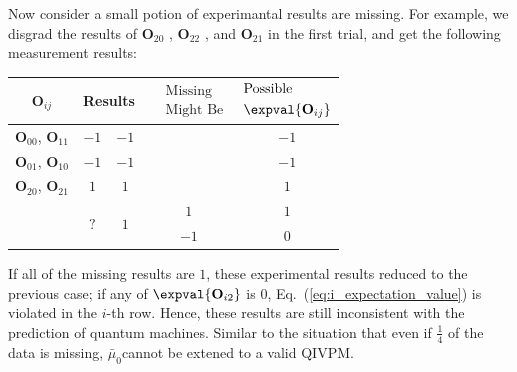 \documentclass[english,reprint, aps, prl,superscriptaddress, showpacs,
showkeys, longbibliography, amsmath, amssymb, floatfix]{revtex4-1}
\theoremstyle{plain}
\theoremstyle{definition}
\newcommand{\missing}{?}
\begin{document}
Now consider a small potion of experimantal results are missing. For
example, we disgrad the results of $\mathbf{O}_{20}$ , $\mathbf{O}_{22}$
, and $\mathbf{O}_{21}$ in the first trial, and get the following
measurement results:
\begin{center}
\begin{tabular}{ccccc}
\toprule 
\addlinespace
$\mathbf{O}_{ij}$  & \multicolumn{2}{c}{Results} & $\begin{aligned} & \textrm{Missing}\\
 & \textrm{Might Be}
\end{aligned}
$  & $\begin{aligned} & \textrm{Possible}\\
 & \expval{\mathbf{O}_{ij}}
\end{aligned}
$\tabularnewline
\midrule
\midrule 
\addlinespace
$\mathbf{O}_{00}$, $\mathbf{O}_{11}$ & $-1$  & $-1$ &  & $-1$\tabularnewline
\midrule 
\addlinespace
$\mathbf{O}_{01}$, $\mathbf{O}_{10}$ & $-1$  & $-1$  &  & $-1$\tabularnewline
\midrule 
\addlinespace
$\mathbf{O}_{20}$, $\mathbf{O}_{21}$ & $1$  & $1$  &  & $1$\tabularnewline
\midrule 
\addlinespace
\multirow{2}{*}{$\mathbf{O}_{02}$, $\mathbf{O}_{12}$, $\mathbf{O}_{22}$} & \multirow{2}{*}{$\missing$} & \multirow{2}{*}{$1$} & $1$ & $1$\tabularnewline
\cmidrule{4-5} 
\addlinespace
 &  &  & $-1$ & $0$\tabularnewline
\bottomrule
\end{tabular}
\par\end{center}

\noindent If all of the missing results are $1$, these experimental
results reduced to the previous case; if any of $\expval{\mathbf{O}_{i2}}$
is $0$, Eq.~(\ref{eq:i_expectation_value}) is violated in the $i$-th
row. Hence, these results are still inconsistent with the prediction
of quantum machines. Similar to the situation that even if $\frac{1}{4}$
of the data is missing, $\bar{\mu}_{0}$cannot be extened to a valid
QIVPM.
\end{document}
